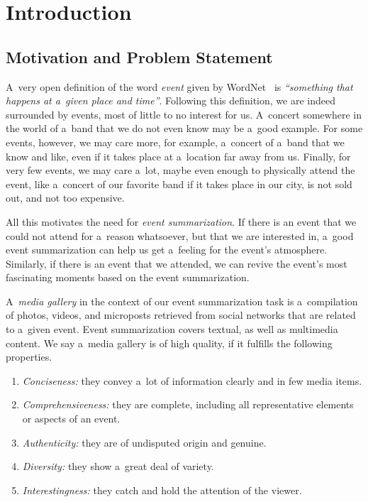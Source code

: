 \chapter{Introduction}
\label{cha:introduction}

\ifpdf
    \graphicspath{{1_introduction/figures/PNG/}{1_introduction/figures/PDF/}{1_introduction/figures/}}
\else
    \graphicspath{{1_introduction/figures/EPS/}{1_introduction/figures/}}
\fi

\section{Motivation and Problem Statement}

A~very open definition of the word \emph{event}
given by WordNet~\cite{fellbaum1998wordnet,miller1995wordnet} is
\emph{``something that happens at a~given place and time''}.
Following this definition,
we are indeed surrounded by events,
most of little to no interest for us.
A~concert somewhere in the world of a~band
that we do not even know may be a~good example.
For some events, however, we may care more, for example,
a~concert of a~band that we know and like,
even if it takes place at a~location far away from us.
Finally, for very few events, we may care a~lot,
maybe even enough to physically attend the event,
like a~concert of our favorite band
if it takes place in our city, is not sold out,
and not too expensive.

All this motivates the need for \emph{event summarization}.
If there is an event that we could not attend
for a~reason whatsoever,
but that we are interested in,
a~good event summarization can help us get a~feeling
for the event's atmosphere.
Similarly, if there is an event that we attended,
we can revive the event's most fascinating moments
based on the event summarization.

A~\emph{media gallery} in the context of
our event summarization task is
a~compilation of photos, videos,
and microposts retrieved from social networks
that are related to a~given event.
Event summarization covers textual,
as well as multimedia content.
We say a~media gallery is of high quality,
if it fulfills the following properties.

\begin{enumerate}
  \item \textit{Conciseness:}
        they convey a~lot of information clearly
        and in few media items.
  \item \textit{Comprehensiveness:}
        they are complete, including all representative
        elements or aspects of an event.
  \item \textit{Authenticity:}
        they are of undisputed origin and genuine.
  \item \textit{Diversity:}
        they show a~great deal of variety.
  \item \textit{Interestingness:}
        they catch and hold the attention of the viewer.     
\end{enumerate}

